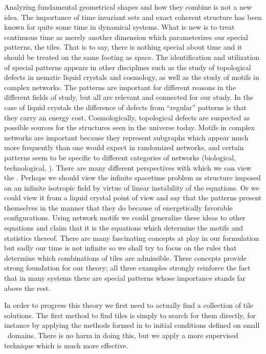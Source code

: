 Analyzing fundamental geometrical shapes and how they combine is not a
new idea. The importance of time invariant sets and exact coherent
structure has been known for quite some time in dynamical systems.
What is new is to treat continuous time as merely another dimension which
parameterizes our special patterns, the tiles. That is to say, there is
nothing special about time and it should be treated on the same footing
as space. The identification and utilization of special patterns appears
in other disciplines such as the study of topological defects in nematic
liquid crystals and cosmology, as well as the
study of motifs in complex networks. The patterns
are important for different reasons in the different fields of study, but
all are relevant and connected for our study. In the case of liquid
crystals the difference of defects from ``regular'' patterns is that they
carry an energy cost. Cosmologically, topological defects are suspected
as possible sources for the structures
seen in the universe today. Motifs in complex
networks are important because they represent subgraphs which appear much
more frequently than one would expect in randomized networks, and certain
patterns seem to be specific to different categories of networks
(biological, technological, \etc). There are many different
perspectives with which we can view the \KSe. Perhaps we should view the
infinite spacetime problem as structure imposed on an infinite isotropic
field by virtue of linear instability of the equations. Or we could view
it from a liquid crystal point of view and say that the patterns present
themselves in the manner that they do because of energetically favorable
configurations. Using network motifs we could generalize these ideas to
other equations and claim that it is the equations which determine the
motifs and statistics thereof. There are many fascinating concepts at
play in our formulation but sadly our time is not infinite so we shall
try to focus on the rules that determine which combinations of tiles are
admissible. These concepts provide strong foundation for our theory; all
three examples strongly reinforce the fact that in many systems there are
special patterns whose importance stands far above the rest.

In order to progress this theory we first need to actually find a
collection of tile solutions. The first method to find tiles is simply to
search for them directly, for instance by applying the methods formed in
 to initial conditions defined on small \spt\
domains. There is no harm in doing this, but we apply a more supervised
technique which is much more effective.

